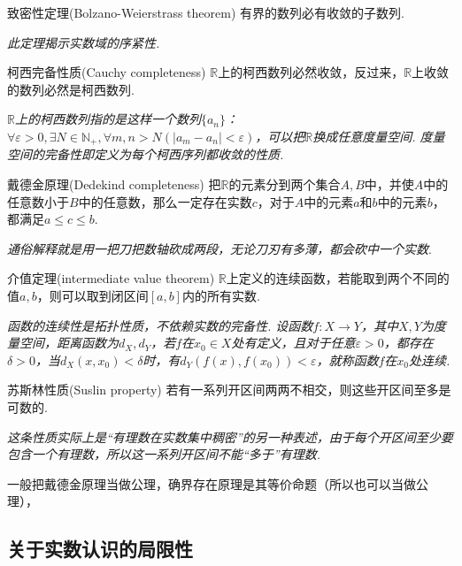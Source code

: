 \documentclass[main.tex]{subfiles}
\begin{document}
\begin{theorem}{致密性定理(Bolzano-Weierstrass theorem)}
    有界的数列必有收敛的子数列.
\end{theorem}


\textit{此定理揭示实数域的序紧性.}

\begin{theorem}{柯西完备性质(Cauchy completeness)}
    \(\mathbb{R}\)上的柯西数列必然收敛，反过来，\(\mathbb{R}\)上收敛的数列必然是柯西数列.
\end{theorem}


\textit{\(\mathbb{R}\)上的柯西数列指的是这样一个数列\(\{a_n\}\)：\(\forall\varepsilon>0,\exists N\in \mathbb{N}_{+}, \forall m,n>N(|a_m-a_n|<\varepsilon)\)，可以把\(\mathbb{R}\)换成任意度量空间. 度量空间的完备性即定义为每个柯西序列都收敛的性质.}

\begin{theorem}{戴德金原理(Dedekind completeness)}
    把\(\mathbb{R}\)的元素分到两个集合\(A,B\)中，并使\(A\)中的任意数小于\(B\)中的任意数，那么一定存在实数\(c\)，对于\(A\)中的元素\(a\)和\(b\)中的元素\(b\)，都满足\(a\leq c\leq b\).
\end{theorem}


\textit{通俗解释就是用一把刀把数轴砍成两段，无论刀刃有多薄，都会砍中一个实数}.

\begin{theorem}{介值定理(intermediate value theorem)}
    \(\mathbb{R}\)上定义的连续函数，若能取到两个不同的值\(a,b\)，则可以取到闭区间\([a,b]\)内的所有实数.
\end{theorem}

\textit{
    函数的连续性是拓扑性质，不依赖实数的完备性. 设函数\(f:X \to Y\)，其中\(X,Y\)为度量空间，距离函数为\(d_X,d_Y\)，若\(f\)在\(x_0 \in X\)处有定义，且对于任意\(\varepsilon > 0\)，都存在\(\delta > 0\)，当\(d_X(x,x_0)<\delta\)时，有\(d_Y(f(x),f(x_0))<\varepsilon\)，就称函数\(f\)在\(x_0\)处连续.
}

\begin{theorem}{苏斯林性质(Suslin property)}
    若有一系列开区间两两不相交，则这些开区间至多是可数的.
\end{theorem}

\textit{这条性质实际上是“有理数在实数集中稠密”的另一种表述，由于每个开区间至少要包含一个有理数，所以这一系列开区间不能“多于”有理数.}

一般把戴德金原理当做公理，确界存在原理是其等价命题（所以也可以当做公理），

\subsection{关于实数认识的局限性}
\end{document}
